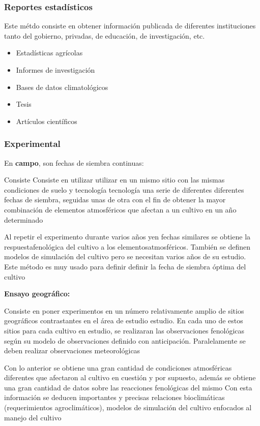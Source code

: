 \subsubsection{Reportes estadísticos}

Este métdo consiste en obtener información publicada de diferentes instituciones tanto del gobierno, privadas, de educación, de investigación, etc.
\begin{itemize}
    \item Estadísticas agrícolas
    \item Informes de investigación
    \item Bases de datos climatológicos
    \item Tesis
    \item Artículos científicos
\end{itemize}
\subsubsection{Experimental}

En \textbf{campo}, son fechas de siembra continuas:

Consiste Consiste en utilizar utilizar en un mismo sitio con las mismas condiciones de suelo y tecnología tecnología una serie de diferentes diferentes fechas de siembra, seguidas unas de otra con el fin de obtener la mayor combinación de elementos atmosféricos que afectan a un cultivo en un año determinado

Al repetir el experimento durante varios años yen fechas similares se obtiene la respuestafenológica del cultivo a los elementosatmosféricos.
También se definen modelos de simulación del cultivo pero se necesitan varios años de su estudio.
Este método es muy usado para definir definir la fecha de siembra óptima del cultivo

\textbf{Ensayo geográfico:}

Consiste en poner experimentos en un número relativamente amplio de sitios geográficos contrastantes en el área de estudio estudio. En cada uno de estos sitios para cada cultivo en estudio, se realizaran las observaciones fenológicas según su modelo de observaciones definido con anticipación. Paralelamente se deben realizar observaciones meteorológicas 

Con lo anterior se obtiene una gran cantidad de condiciones atmosféricas diferentes que afectaron al cultivo en cuestión y por supuesto, además se obtiene una gran cantidad de datos sobre las reacciones fenológicas del mismo
Con esta información se deducen importantes y precisas relaciones bioclimáticas (requerimientos agroclimáticos), modelos de simulación del cultivo enfocados al manejo del cultivo

